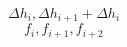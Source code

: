 \begin{equation} 
\Delta h_{{i}} , \Delta h_{{i+1}} + \Delta h_{{i}}
 \end{equation} 
\begin{equation} 
f_{i} , f_{{i+1}} , f_{{i+2}}
 \end{equation}